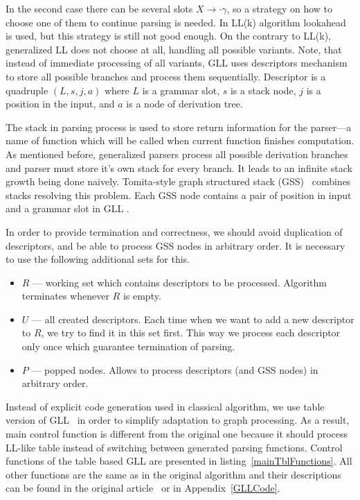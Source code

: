 In the second case there can be several slots $X \rightarrow \cdot \gamma$, so a strategy on how to choose one of them to continue parsing is needed.
In LL(k) algorithm lookahead is used, but this strategy is still not good enough.
On the contrary to LL(k), generalized LL does not choose at all, handling all possible variants.
Note, that instead of immediate processing of all variants, GLL uses descriptors mechanism to store all possible branches and process them sequentially. 
Descriptor is a quadruple $(L, s, j, a)$ where $L$ is a grammar slot, $s$ is a stack node, $j$ is a position in the input, and $a$ is a node of derivation tree. 

The stack in parsing process is used to store return information for the parser---a name of function which will be called when current function finishes computation. 
As mentioned before, generalized parsers process all possible derivation branches and parser must store it's own stack for every branch. 
It leads to an infinite stack growth being done naively.  
Tomita-style graph structured stack (GSS)~\cite{Tomita} combines stacks resolving this problem.
Each GSS node contains a pair of position in input and a grammar slot in GLL . 

In order to provide termination and correctness, we should avoid duplication of descriptors, and be able to process GSS nodes in arbitrary order. It is necessary to use the following additional sets for this.
\begin{itemize}
\item $R$ --- working set which contains descriptors to be processed. Algorithm terminates whenever $R$ is empty.
\item $U$ --- all created descriptors. Each time when we want to add a new descriptor to $R$, we try to find it in this set first.
This way we process each descriptor only once which guarantee termination of parsing.
\item $P$ --- popped nodes. Allows to process descriptors (and GSS nodes) in arbitrary order. 
\end{itemize}

Instead of explicit code generation used in classical algorithm, we use table version of GLL~\cite{TableGLL} in order to simplify adaptation to graph processing.
As a result, main control function is different from the original one because it should process LL-like table instead of switching between generated parsing functions.
Control functions of the table based GLL are presented in listing~\ref{mainTblFunctions}.
All other functions are the same as in the original algorithm and their descriptions can be found in the original article~\cite{scott2010gll} or in Appendix~\ref{GLLCode}.

